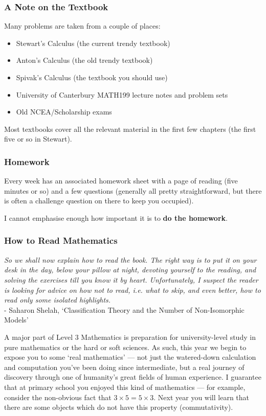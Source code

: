\subsubsection*{A Note on the Textbook}
Many problems are taken from a couple of places:
\begin{itemize}
  \item Stewart's Calculus (the current trendy textbook)
  \item Anton's Calculus (the old trendy textbook)
  \item Spivak's Calculus (the textbook you should use)
  \item University of Canterbury MATH199 lecture notes and problem sets
  \item Old NCEA/Scholarship exams
\end{itemize}
Most textbooks cover all the relevant material in the first few chapters (the first five or so in Stewart).

\subsubsection*{Homework}
Every week has an associated homework sheet with a page of reading (five minutes or so) and a few questions (generally all
pretty straightforward, but there is often a challenge question on there to keep you occupied).

I cannot emphasise enough how important it is to \textbf{do the homework}.

\subsubsection*{How to Read Mathematics}
\begin{center}
  \textit{So we shall now explain how to read the book. The right way is to put it on your desk in the day, below your pillow at night, devoting yourself to the reading, and solving the exercises till you know it by heart. Unfortunately, I suspect the reader is looking for advice on how not to read, i.e. what to skip, and even better, how to read only some isolated highlights.}\\ - Saharon Shelah, `Classification Theory and the Number of Non-Isomorphic Models'
\end{center}

A major part of Level 3 Mathematics is preparation for university-level study in pure mathematics or the hard or soft sciences. As such, this
year we begin to expose you to some `real mathematics' --- not just the watered-down calculation and computation you've been doing since intermediate,
but a real journey of discovery through one of humanity's great fields of human experience. I guarantee that at primary school you enjoyed
this kind of mathematics --- for example, consider the non-obvious fact that $ 3 \times 5 = 5 \times 3 $. Next year you will learn that there are
some objects which do not have this property (commutativity).

